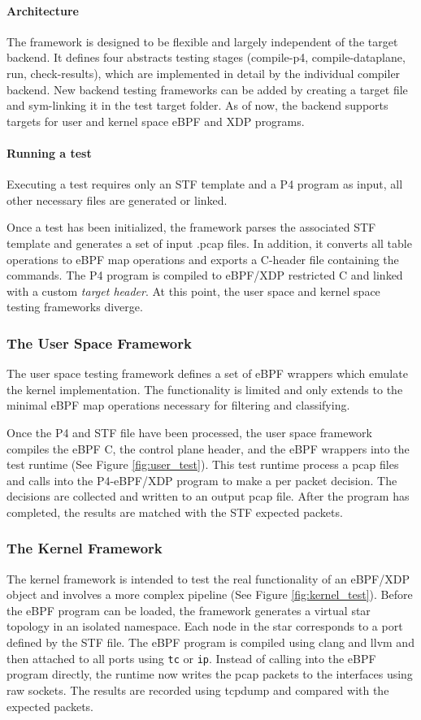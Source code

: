 \paragraph{Architecture}
The framework is designed to be flexible and largely independent of the target 
backend.
It defines four abstracts testing stages (compile-p4, compile-dataplane, run, 
check-results), which are implemented in detail by the individual compiler 
backend. New backend testing frameworks can be added by creating a target file 
and sym-linking it in the test target folder. 
As of now, the backend supports targets for user and kernel space eBPF and XDP 
programs.

\paragraph{Running a test}
Executing a test requires only an STF template and a P4 program as input, all 
other necessary files are generated or linked.

Once a test has been initialized, the framework parses the associated STF 
template and generates a set of input .pcap files. In 
addition, it converts all table operations to eBPF 
map operations and exports a C-header file containing the commands.
The P4 program is compiled to eBPF/XDP restricted C and linked with a custom 
\textit{target header}. At this point, the user space and kernel space testing 
frameworks diverge.

\subsubsection{The User Space Framework}
The user space testing framework defines a set of eBPF wrappers which emulate 
the kernel implementation. The functionality is limited and only extends 
to the minimal eBPF map operations necessary for filtering and classifying.

Once the P4 and STF file have been processed, the user space framework compiles 
the eBPF C, the control plane header, and the eBPF wrappers into the test 
runtime (See Figure \ref{fig:user_test}). 
This test runtime process a pcap files and calls into the P4-eBPF/XDP program 
to make a per packet decision. The decisions are collected and written to an 
output pcap file. After the program has completed, the results are matched 
with the STF expected packets.

\subsubsection{The Kernel Framework}
The kernel framework is intended to test the real functionality of an eBPF/XDP 
object and involves a more complex pipeline (See Figure 
\ref{fig:kernel_test}). 
Before the eBPF program can be loaded, the framework generates a virtual star 
topology in an isolated namespace. Each node in the star corresponds to a port 
defined by the STF file. The eBPF program is compiled using clang and llvm 
and then attached to all ports using \texttt{tc} or \texttt{ip}.
Instead of calling into the eBPF program directly, the runtime now writes the 
pcap packets to the interfaces using raw sockets. The results are recorded 
using tcpdump and compared with the expected packets.

